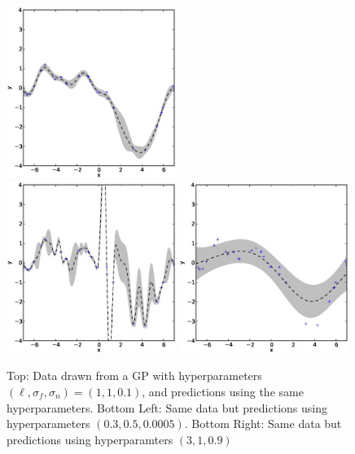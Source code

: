 \documentclass[a4paper,11pt,article,oneside]{memoir}
\begin{document}
\begin{figure}[htb]
\centering
\includegraphics[width=0.49\textwidth]{fig6} \\ \includegraphics[width=0.49\textwidth]{fig7} \includegraphics[width=0.49\textwidth]{fig8}
\caption{Top: Data drawn from a GP with hyperparameters $(\ell,\sigma_f,\sigma_n)=(1,1,0.1)$, and predictions using the same hyperparameters. Bottom Left: Same data but predictions using hyperparameters $(0.3,0.5,0.0005)$. Bottom Right: Same data but predictions using hyperparamters $(3,1,0.9)$}
\label{fig:varyhyper}
\end{figure}
\end{document}
